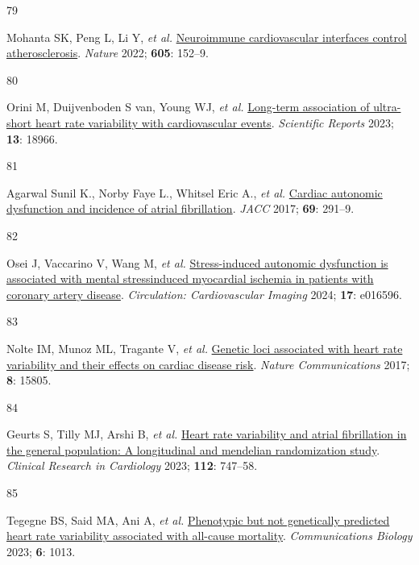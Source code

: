 \documentclass[
  a4paper,
  headsepline=true,
  open=any]{scrbook}
\newlength{\cslhangindent}
\newlength{\csllabelwidth}
\newlength{\cslentryspacingunit} %
\newenvironment{CSLReferences}[2] %
 {%
  \setlength{\parindent}{0pt}
  \ifodd #1
  \let\oldpar\par
  \def\par{\hangindent=\cslhangindent\oldpar}
  \fi
  \setlength{\parskip}{#2\cslentryspacingunit}
 }%
 {}
\newcommand{\CSLLeftMargin}[1]{\parbox[t]{\csllabelwidth}{#1}}
\newcommand{\CSLRightInline}[1]{\parbox[t]{\linewidth - \csllabelwidth}{#1}\break}
\begin{document}
\begin{CSLReferences}{0}{0}
\leavevmode{}%
\CSLLeftMargin{79 }%
\CSLRightInline{Mohanta SK, Peng L, Li Y, \emph{et al.}
\href{https://doi.org/10.1038/s41586-022-04673-6}{Neuroimmune
cardiovascular interfaces control atherosclerosis}. \emph{Nature} 2022;
\textbf{605}: 152--9.}

\leavevmode{}%
\CSLLeftMargin{80 }%
\CSLRightInline{Orini M, Duijvenboden S van, Young WJ, \emph{et al.}
\href{https://doi.org/10.1038/s41598-023-45988-2}{Long-term association
of ultra-short heart rate variability with cardiovascular events}.
\emph{Scientific Reports} 2023; \textbf{13}: 18966.}

\leavevmode{}%
\CSLLeftMargin{81 }%
\CSLRightInline{Agarwal Sunil K., Norby Faye L., Whitsel Eric A.,
\emph{et al.} \href{https://doi.org/10.1016/j.jacc.2016.10.059}{Cardiac
autonomic dysfunction and incidence of atrial fibrillation}. \emph{JACC}
2017; \textbf{69}: 291--9.}

\leavevmode{}%
\CSLLeftMargin{82 }%
\CSLRightInline{Osei J, Vaccarino V, Wang M, \emph{et al.}
\href{https://doi.org/10.1161/CIRCIMAGING.124.016596}{Stress-induced
autonomic dysfunction is associated with mental
stress{\textendash}induced myocardial ischemia in patients with coronary
artery disease}. \emph{Circulation: Cardiovascular Imaging} 2024;
\textbf{17}: e016596.}

\leavevmode{}%
\CSLLeftMargin{83 }%
\CSLRightInline{Nolte IM, Munoz ML, Tragante V, \emph{et al.}
\href{https://doi.org/10.1038/ncomms15805}{Genetic loci associated with
heart rate variability and their effects on cardiac disease risk}.
\emph{Nature Communications} 2017; \textbf{8}: 15805.}

\leavevmode{}%
\CSLLeftMargin{84 }%
\CSLRightInline{Geurts S, Tilly MJ, Arshi B, \emph{et al.}
\href{https://doi.org/10.1007/s00392-022-02072-5}{Heart rate variability
and atrial fibrillation in the general population: A longitudinal and
mendelian randomization study}. \emph{Clinical Research in Cardiology}
2023; \textbf{112}: 747--58.}

\leavevmode{}%
\CSLLeftMargin{85 }%
\CSLRightInline{Tegegne BS, Said MA, Ani A, \emph{et al.}
\href{https://doi.org/10.1038/s42003-023-05376-y}{Phenotypic but not
genetically predicted heart rate variability associated with all-cause
mortality}. \emph{Communications Biology} 2023; \textbf{6}: 1013.}


\end{CSLReferences}
\end{document}
